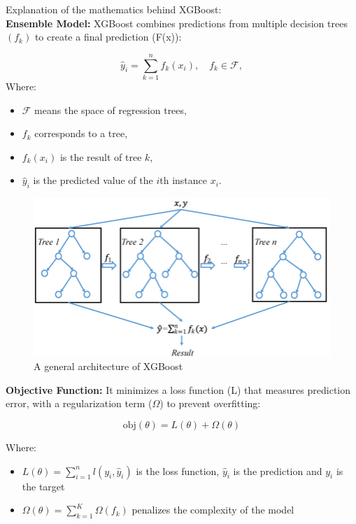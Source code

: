 \documentclass{ieeeojies}
\begin{document}
Explanation of the mathematics behind XGBoost:\\
\textbf{Ensemble Model:} XGBoost combines predictions from multiple decision trees $(f_k)$ to create a final prediction (F(x))\cite{Xgboost}:

\begin{equation*}
\hat{y}_i = \sum_{k=1}^n f_k(x_i), \quad f_k \in \mathcal{F},
\end{equation*}
Where:
\begin{itemize}
\item \(\mathcal{F}\) means the space of regression trees, 
\item \( f_k \) corresponds to a tree,
\item \( f_k(x_i) \) is the result of tree \( k \),
\item \( \hat{y}_i \) is the predicted value of the \( i \)th instance \( x_i \).
\end{itemize}

\begin{figure}[H]
    \centering
\begin{minipage}{0.4\textwidth}
        \centering
        \includegraphics[width=\textwidth]{bibliography/Figure/xgboost.png}
        \caption{A general architecture of XGBoost}
        \label{fig:3}
\end{minipage}
\end{figure}

\textbf{Objective Function:}
It minimizes a loss function (L) that measures prediction error, with a regularization term ($\Omega$) to prevent overfitting:\cite{geekXGboost}

\begin{equation*}
\text{obj}(\theta) = L(\theta) + \Omega(\theta)
\end{equation*}

Where:
\begin{itemize}
    \item \( L(\theta) = \sum_{i=1}^n l(y_i, \hat{y}_i) \) is the loss function, \(\hat{y}_i\) is the prediction and \( y_i \) is the target
    \item \( \Omega(\theta) = \sum_{k=1}^K \Omega(f_k) \) penalizes the complexity of the model
\end{itemize}
\end{document}
